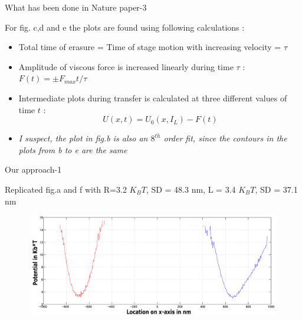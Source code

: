\documentclass{beamer}
\begin{document}
\begin{frame}{What has been done in Nature paper-3} 

For fig. c,d and e the plots are found using following calculations :
\begin{itemize}

\item Total time of erasure = Time of stage motion with increasing velocity = $\tau$
\item Amplitude of viscous force is increased linearly during time $\tau$ : $F(t)=\pm F_{max}t/\tau$
\item Intermediate plots during transfer is calculated at three different values of time $t$ :
\begin{equation*}
U(x,t) = U_0(x,I_L)- F(t)
\end{equation*}
\item \textit{I suspect, the plot in fig.b is also an $8^{th}$ order fit, since the contours in the plots from b to e are the same}

\end{itemize}

\end{frame}
\begin{frame}{Our approach-1} 

Replicated fig.a and f with R=3.2 $K_BT$, SD = 48.3 nm, L = 3.4 $K_BT$, SD = 37.1 nm 
\begin{figure}
    \centering
    \includegraphics[height=4.5cm,width=12cm]{I4k_both_wells_700_1.eps}

\end{figure}


\end{frame}
\end{document}

